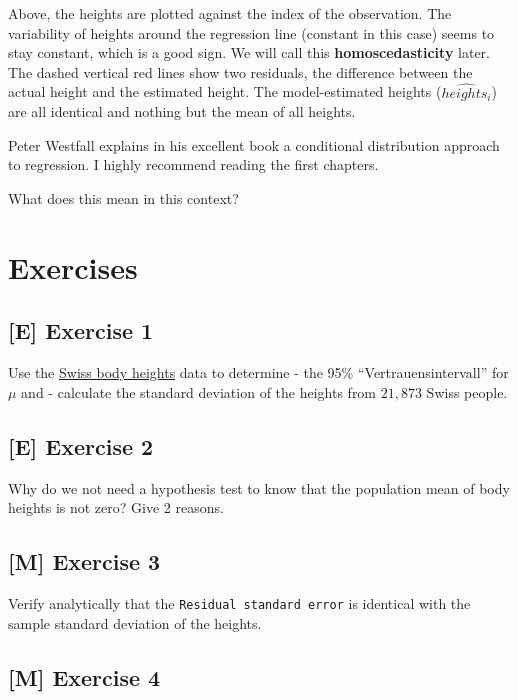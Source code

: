 \documentclass[
]{book}
\begin{document}
Above, the heights are plotted against the index of the observation.
The variability of heights around the regression line (constant in this case) seems to
stay constant, which is a good sign. We will call this \textbf{homoscedasticity} later.
The dashed vertical red lines show two residuals, the difference between the actual height
and the estimated height. The model-estimated heights (\(\widehat{heights_i}\))
are all identical and nothing but the mean of all heights.

Peter Westfall explains in his excellent book a conditional distribution
approach to regression. I highly recommend reading the first chapters.

What does this mean in this context?

\section{Exercises}\label{exercises}

\subsection{{[}E{]} Exercise 1}\label{exercise1_Intro}

Use the \href{https://www.bfs.admin.ch/asset/de/30305714}{Swiss body heights} data to
determine
- the 95\% ``Vertrauensintervall'' for \(\mu\) and
- calculate the standard deviation of the heights from \(21,873\) Swiss people.

\subsection{{[}E{]} Exercise 2}\label{exercise2_Intro}

Why do we not need a hypothesis test to know that the population mean of body heights is not zero?
Give 2 reasons.

\subsection{{[}M{]} Exercise 3}\label{exercise3_Intro}

Verify analytically that the \texttt{Residual\ standard\ error} is identical with
the sample standard deviation of the heights.

\subsection{{[}M{]} Exercise 4}\label{exercise4_Intro}
\end{document}
